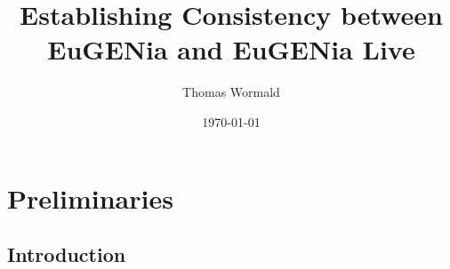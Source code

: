 \documentclass[authoryearcitations]{UoYCSproject}
\title{Establishing Consistency between EuGENia and EuGENia Live}
\author{Thomas Wormald}
\date{\today}
\begin{document}
\maketitle
\listoffigures
\listoftables

\cleardoublepage
\part{Preliminaries}
\label{sec:start}
\thispagestyle{empty}\cleardoublepage

\chapter{Introduction}
\end{document}
